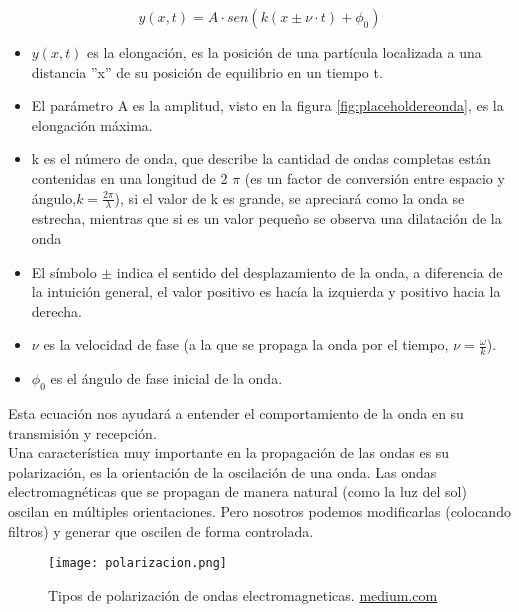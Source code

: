 \begin{definicion}
\begin{equation}
	y(x,t) = A \cdot  sen(k (x \pm \nu \cdot t) + \phi_0)
\end{equation}
\end{definicion}

\begin{itemize}
\item \(y(x,t)\) es la elongación, es la posición de una partícula localizada a una distancia ''x'' de su posición de equilibrio en un tiempo t.
\item El parámetro A es la amplitud, visto en la figura \ref{fig:placeholdereonda}, es la elongación máxima.
\item k es el número de onda, que describe la cantidad de ondas completas están contenidas en una longitud de 2 \(\pi\) (es un factor de conversión entre espacio y ángulo,\(k = \frac{2 \pi}{\lambda}\)), si el valor de k es grande, se apreciará como la onda se estrecha, mientras que si es un valor pequeño se observa una dilatación de la onda
\item  El símbolo \(\pm\) indica el sentido del desplazamiento de la onda, a diferencia de la intuición general, el valor positivo es hacía la izquierda y positivo hacia la derecha.
\item \(\nu\) es la velocidad de fase (a la que se propaga la onda por el tiempo, \(\nu = \frac{\omega}{k}\)). 
\item \(\phi_0\) es el ángulo de fase inicial de la onda.\\
\end{itemize}

Esta ecuación nos ayudará a entender el comportamiento de la onda en su transmisión y recepción.\\

Una característica muy importante en la propagación de las ondas es su polarización, es la orientación de la oscilación de una onda. Las ondas electromagnéticas que se propagan de manera natural (como la luz del sol) oscilan en múltiples orientaciones. Pero nosotros podemos modificarlas (colocando filtros) y generar que oscilen de forma controlada.

\begin{figure}[H]
    \centering
    \texttt{[image: polarizacion.png]}
    \caption{Tipos de polarización de ondas electromagneticas. \href{https://medium.com/@steven98.sr/polarizaci\%C3\%B3n-de-ondas-electromagn\%C3\%A9ticas-67bce51a203d}{medium.com}}
    \label{fig:placeholdeeeeerjejejejejeejej}
\end{figure}

